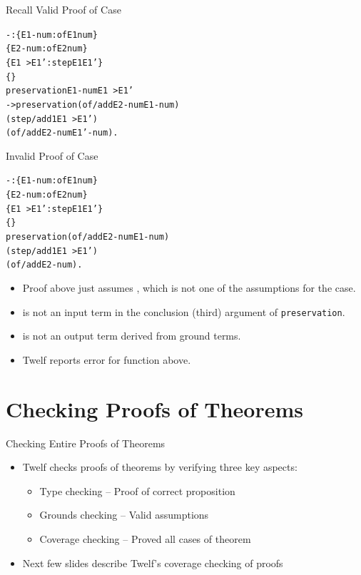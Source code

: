 \documentclass{beamer}
\begin{document}
\begin{frame}[containsverbatim]{Recall Valid Proof of Case}
\begin{alltt}
- : \{E1-num  : of E1 num\}
    \{E2-num  : of E2 num\}
    \{E1~>E1' : step E1 E1'\}
    \{\}
    preservation E1-num E1~>E1' 
      -> preservation (of/add E2-num E1-num)
                      (step/add1 E1~>E1')
                      (of/add E2-num E1'-num).
\end{alltt}
\end{frame}


\begin{frame}[containsverbatim]{Invalid Proof of Case}
\begin{alltt}
- : \{E1-num  : of E1 num \}
    \{E2-num  : of E2 num \}
    \{E1~>E1' : step E1 E1' \}
    \{ \}
    preservation (of/add E2-num E1-num)
                 (step/add1 E1~>E1')
                 (of/add E2-num ).
\end{alltt}

\begin{itemize}
\item Proof above just assumes \texttt{},
which is not one of the assumptions for the case.

\item \texttt{} is not an input term
in the conclusion (third) argument of \texttt{preservation}.

\item \texttt{} is not an output term
derived from ground terms.

\item Twelf reports error for function above.
\end{itemize}
\end{frame}

\section{Checking Proofs of Theorems}

\begin{frame}{Checking Entire Proofs of Theorems}
\begin{itemize}
\item Twelf checks proofs of theorems by verifying three key aspects:
	\begin{itemize}
	\item Type checking -- Proof of correct proposition
	\item Grounds checking -- Valid assumptions
	\item Coverage checking -- Proved all cases of theorem
	\end{itemize}
\item Next few slides describe Twelf's coverage checking of proofs
\end{itemize}
\end{frame}
\end{document}
